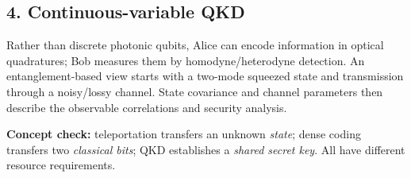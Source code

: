 \subsection*{4. Continuous-variable QKD}
Rather than discrete photonic qubits, Alice can encode
information in optical quadratures; Bob measures them by
homodyne/heterodyne detection. An entanglement-based view
starts with a two-mode squeezed state and transmission through
a noisy/lossy channel. State covariance and channel parameters
then describe the observable correlations and security analysis.
\begin{cautionbox}
\textbf{Concept check:} teleportation transfers an unknown \emph{state};
dense coding transfers two \emph{classical bits};
QKD establishes a \emph{shared secret key}.
All have different resource requirements.
\end{cautionbox}
